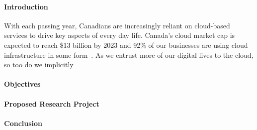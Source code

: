 \setcounter{page}{1}

\paragraph*{Introduction}

With each passing year, Canadians are increasingly reliant on cloud-based services to
drive key aspects of every day life. Canada's cloud market cap is expected to reach \$13
billion by 2023 and 92\% of our businesses are using cloud infrastructure in some
form~\cite{miltz2019_spending}. As we entrust more of our digital lives to the cloud,
so too do we implicitly

\paragraph*{Objectives}

\paragraph*{Proposed Research Project}

\paragraph*{Conclusion}
